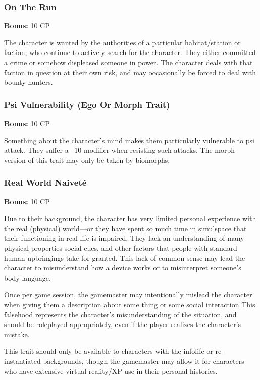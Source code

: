\subsubsection{On The Run}

\textbf{Bonus:} 10 CP

The character is wanted by the authorities of a 
particular habitat/station or faction, who continue to 
actively search for the character. They either committed
a crime or somehow displeased someone in power.
The character deals with that faction in question at 
their own risk, and may occasionally be forced to deal 
with bounty hunters.

\subsubsection{Psi Vulnerability (Ego Or Morph Trait)}

\textbf{Bonus:} 10 CP

Something about the character's mind makes 
them particularly vulnerable to psi attack. They 
suffer a –10 modifier when resisting such attacks. 
The morph version of this trait may only be taken 
by biomorphs.

\subsubsection{Real World Naiveté}

\textbf{Bonus:} 10 CP

Due to their background, the character has very 
limited personal experience with the real (physical) 
world—or they have spent so much time in simulspace
that their functioning in real life is impaired.
They lack an understanding of many physical properties
social cues, and other factors that people with
standard human upbringings take for granted. This 
lack of common sense may lead the character to 
misunderstand how a device works or to misinterpret 
someone's body language.

Once per game session, the gamemaster may intentionally
mislead the character when giving them
a description about some thing or some social interaction
This falsehood represents the character's
misunderstanding of the situation, and should be 
roleplayed appropriately, even if the player realizes 
the character's mistake.

This trait should only be available to characters 
with the infolife or re-instantiated backgrounds, 
though the gamemaster may allow it for characters 
who have extensive virtual reality/XP use in their 
personal histories.

